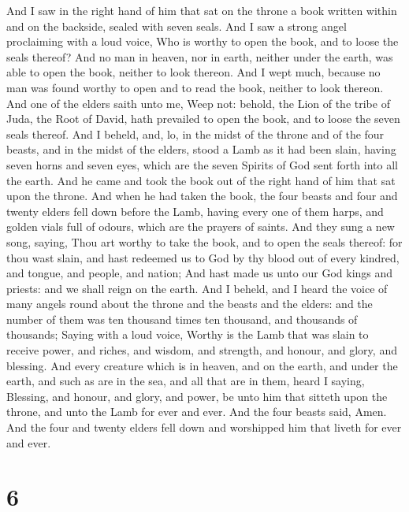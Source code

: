  And I saw in the right hand of him that sat on the throne a
book written within and on the backside, sealed with seven seals.
 And I saw a strong angel proclaiming with a loud voice, Who
is worthy to open the book, and to loose the seals thereof? 
And no man in heaven, nor in earth, neither under the earth, was able to
open the book, neither to look thereon.  And I wept much,
because no man was found worthy to open and to read the book, neither to
look thereon.  And one of the elders saith unto me, Weep
not: behold, the Lion of the tribe of Juda, the Root of David, hath
prevailed to open the book, and to loose the seven seals thereof.
 And I beheld, and, lo, in the midst of the throne and of
the four beasts, and in the midst of the elders, stood a Lamb as it had
been slain, having seven horns and seven eyes, which are the seven
Spirits of God sent forth into all the earth.  And he came
and took the book out of the right hand of him that sat upon the throne.
 And when he had taken the book, the four beasts and four
and twenty elders fell down before the Lamb, having every one of them
harps, and golden vials full of odours, which are the prayers of saints.
 And they sung a new song, saying, Thou art worthy to take
the book, and to open the seals thereof: for thou wast slain, and hast
redeemed us to God by thy blood out of every kindred, and tongue, and
people, and nation;  And hast made us unto our God kings
and priests: and we shall reign on the earth.  And I
beheld, and I heard the voice of many angels round about the throne and
the beasts and the elders: and the number of them was ten thousand times
ten thousand, and thousands of thousands;  Saying with a
loud voice, Worthy is the Lamb that was slain to receive power, and
riches, and wisdom, and strength, and honour, and glory, and blessing.
 And every creature which is in heaven, and on the earth,
and under the earth, and such as are in the sea, and all that are in
them, heard I saying, Blessing, and honour, and glory, and power, be
unto him that sitteth upon the throne, and unto the Lamb for ever and
ever.  And the four beasts said, Amen. And the four and
twenty elders fell down and worshipped him that liveth for ever and
ever.

\hypertarget{section-5}{%
\section{6}\label{section-5}}

